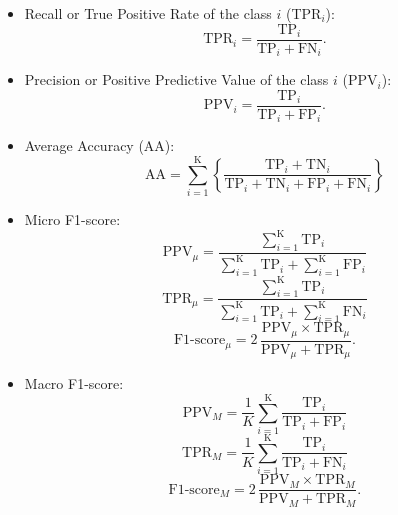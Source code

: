 \begin{itemize}
	\item Recall or True Positive Rate of the class $i$ (TPR$_i$): 
	\begin{equation*}
	\text{TPR$_i$} = \frac{\text{TP}_i}{\text{TP}_i + \text{FN}_i}.
	\end{equation*}
	\item Precision or Positive Predictive Value of the class $i$ (PPV$_i$): \begin{equation*}
	\text{PPV$_i$} = \frac{\text{TP}_i}{\text{TP}_i + \text{FP}_i}.
	\end{equation*}
	\item Average Accuracy (AA):
	\begin{equation*}
	\text{AA} = \sum^{\text{K}}_{i = 1}\left\{\frac{\text{TP}_i + \text{TN}_i}{\text{TP}_i + \text{TN}_i + \text{FP}_i + \text{FN}_i}\right\} 
	\end{equation*}
	\item Micro F1-score: 
	\begin{equation*}
    	\text{PPV}_\mu = \frac{\sum^{\text{K}}_{i = 1}\text{TP}_i}{\sum^{\text{K}}_{i = 1}\text{TP}_i + \sum^{\text{K}}_{i = 1}\text{FP}_i}
	\end{equation*}
	\begin{equation*}
	    \text{TPR}_\mu =  \frac{\sum^{\text{K}}_{i = 1}\text{TP}_i}{\sum^{\text{K}}_{i = 1}\text{TP}_i + \sum^{\text{K}}_{i = 1}\text{FN}_i}
	\end{equation*}
	\begin{equation*}
	    \text{F1-score}_\mu = 2 \, \frac{\text{PPV}_\mu \times \text{TPR}_\mu}{\text{PPV}_\mu + \text{TPR}_\mu}.
	\end{equation*}
	\item Macro F1-score: 
	\begin{equation*}
	\text{PPV}_M = \frac{1}{K} \sum^{\text{K}}_{i = 1}\frac{\text{TP}_i}{\text{TP}_i + \text{FP}_i}
	\end{equation*}
	\begin{equation*}
	\text{TPR}_M =  \frac{1}{K} \sum^{\text{K}}_{i = 1}\frac{\text{TP}_i}{\text{TP}_i + \text{FN}_i}
	\end{equation*}
	\begin{equation*}
	\text{F1-score}_M = 2 \, \frac{\text{PPV}_M \times \text{TPR}_M}{\text{PPV}_M + \text{TPR}_M}.
	\end{equation*}
\end{itemize}

